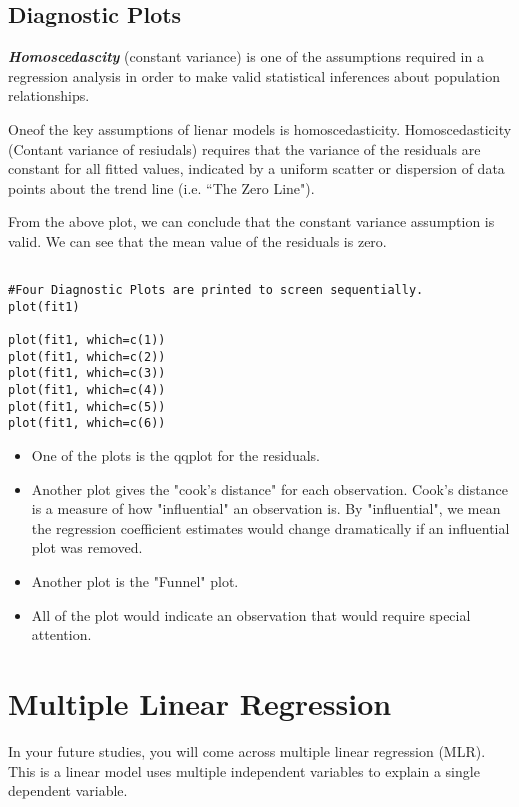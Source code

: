 \documentclass[a4paper,12pt]{article}
\begin{document}
\newpage

\subsection{Diagnostic Plots}
\textbf{\emph{Homoscedascity }}(constant variance) is one of the assumptions required in a regression analysis in order to make valid statistical inferences about population relationships.

Oneof the key assumptions of lienar models is homoscedasticity. Homoscedasticity (Contant variance of resiudals) requires that the variance of the residuals are constant for all fitted values, indicated by a uniform scatter or dispersion of data points about the trend line (i.e. ``The Zero Line").

From the above plot, we can conclude that the constant variance assumption is valid. We can see that the mean value of the residuals is zero.
\begin{framed}
\begin{verbatim}

#Four Diagnostic Plots are printed to screen sequentially.
plot(fit1)

plot(fit1, which=c(1))
plot(fit1, which=c(2))
plot(fit1, which=c(3))
plot(fit1, which=c(4))
plot(fit1, which=c(5))
plot(fit1, which=c(6))
\end{verbatim}
\end{framed}
\begin{itemize}
\item One of the plots is the qqplot for the residuals.
\item Another plot gives the "cook's distance" for each observation. Cook's distance is a measure of how "influential" an observation is. By "influential", we mean the regression coefficient estimates would change dramatically if an influential plot was removed.
\item Another plot is the "Funnel" plot.
\item All of the plot would indicate an observation that would require special attention.
\end{itemize}
\newpage
\section{Multiple Linear Regression}
In your future studies, you will come across multiple linear regression (MLR). This is a linear model uses multiple independent variables to explain a single dependent variable.
\end{document}
